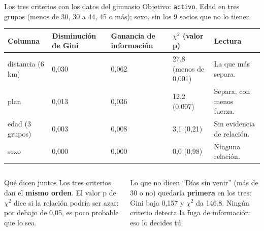 \documentclass[aspectratio=169,11pt]{beamer}
\begin{document}
\begin{frame}[t]{Los tres criterios con los datos del gimnasio}
  \footnotesize
  Objetivo: \texttt{activo}. Edad en tres grupos (menos de 30, 30 a 44, 45 o
  más); sexo, sin los 9 socios que no lo tienen.
  \vspace{0.05cm}

  \renewcommand{\arraystretch}{1.18}
  \begin{tabular}{@{}L{2.5cm}C{2.0cm}C{2.0cm}C{2.2cm}L{3.5cm}@{}}
    \toprule
    \textbf{Columna} & \textbf{Disminución de Gini} & \textbf{Ganancia de información} & \textbf{$\chi^2$ (valor p)} & \textbf{Lectura} \\
    \midrule
    distancia (6 km) & 0,030 & 0,062 & 27,8 (menos de 0,001) & La que más separa. \\
    plan & 0,013 & 0,036 & 12,2 (0,007) & Separa, con menos fuerza. \\
    edad (3 grupos) & 0,003 & 0,008 & 3,1 (0,21) & Sin evidencia de relación. \\
    sexo & 0,000 & 0,000 & 0,0 (0,98) & Ninguna relación. \\
    \bottomrule
  \end{tabular}
  \vspace{0.12cm}

  \begin{columns}[T,onlytextwidth]
    \begin{block}{Qué dicen juntos}
      \footnotesize Los tres criterios dan el \textbf{mismo orden}. El valor
      p de $\chi^2$ dice si la relación podría ser azar: por debajo de 0,05,
      es poco probable que lo sea.
    \end{block}
    \begin{alertblock}{Lo que no dicen}
      \footnotesize ``Días sin venir'' (más de 30 o no) quedaría
      \textbf{primera} en los tres: Gini baja 0,157 y $\chi^2$ da 146,8.
      Ningún criterio detecta la fuga de información: eso lo decides tú.
    \end{alertblock}
  \end{columns}
\end{frame}
\end{document}

